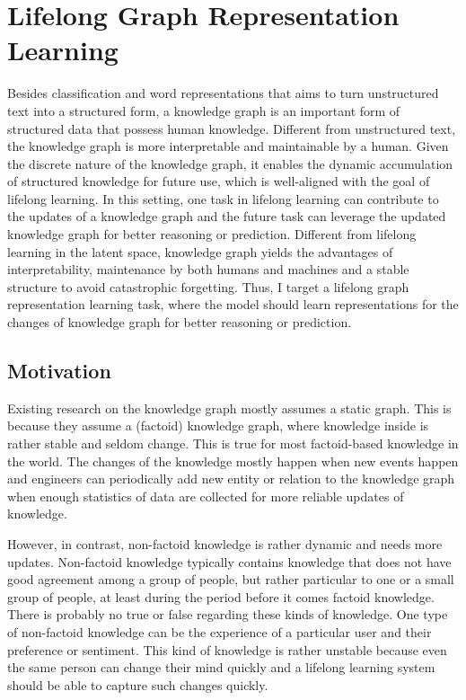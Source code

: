 \chapter{Lifelong Graph Representation Learning}
\label{chap5:graph}

Besides classification and word representations that aims to turn unstructured text into a structured form, a knowledge graph is an important form of structured data that possess human knowledge.
Different from unstructured text, the knowledge graph is more interpretable and maintainable by a human.
Given the discrete nature of the knowledge graph, it enables the dynamic accumulation of structured knowledge for future use, which is well-aligned with the goal of lifelong learning.
In this setting, one task in lifelong learning can contribute to the updates of a knowledge graph and the future task can leverage the updated knowledge graph for better reasoning or prediction.
Different from lifelong learning in the latent space, knowledge graph yields the advantages of interpretability, maintenance by both humans and machines and a stable structure to avoid catastrophic forgetting.
Thus, I target a lifelong graph representation learning task, where the model should learn representations for the changes of knowledge graph for better reasoning or prediction.

\section{Motivation}

Existing research on the knowledge graph mostly assumes a static graph.
This is because they assume a (factoid) knowledge graph, where knowledge inside is rather stable and seldom change.
This is true for most factoid-based knowledge in the world.
The changes of the knowledge mostly happen when new events happen and engineers can periodically add new entity or relation to the knowledge graph when enough statistics of data are collected for more reliable updates of knowledge.

However, in contrast, non-factoid knowledge is rather dynamic and needs more updates.
Non-factoid knowledge typically contains knowledge that does not have good agreement among a group of people, but rather particular to one or a small group of people, at least during the period before it comes factoid knowledge.
There is probably no true or false regarding these kinds of knowledge.
One type of non-factoid knowledge can be the experience of a particular user and their preference or sentiment.
This kind of knowledge is rather unstable because even the same person can change their mind quickly and a lifelong learning system should be able to capture such changes quickly.

